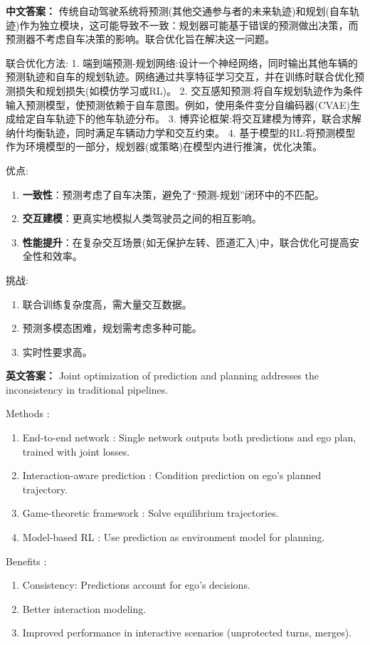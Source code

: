 \documentclass[10pt,a4paper]{ctexart}
\begin{document}
\textbf{中文答案：}  
传统自动驾驶系统将预测(其他交通参与者的未来轨迹)和规划(自车轨迹)作为独立模块，这可能导致不一致：规划器可能基于错误的预测做出决策，而预测器不考虑自车决策的影响。联合优化旨在解决这一问题。

 联合优化方法:
1.  端到端预测-规划网络:设计一个神经网络，同时输出其他车辆的预测轨迹和自车的规划轨迹。网络通过共享特征学习交互，并在训练时联合优化预测损失和规划损失(如模仿学习或RL)。
2.  交互感知预测:将自车规划轨迹作为条件输入预测模型，使预测依赖于自车意图。例如，使用条件变分自编码器(CVAE)生成给定自车轨迹下的他车轨迹分布。
3.  博弈论框架:将交互建模为博弈，联合求解纳什均衡轨迹，同时满足车辆动力学和交互约束。
4.  基于模型的RL:将预测模型作为环境模型的一部分，规划器(或策略)在模型内进行推演，优化决策。

 优点:
\begin{enumerate}
    \item \textbf{一致性}：预测考虑了自车决策，避免了“预测-规划”闭环中的不匹配。
    \item \textbf{交互建模}：更真实地模拟人类驾驶员之间的相互影响。
    \item \textbf{性能提升}：在复杂交互场景(如无保护左转、匝道汇入)中，联合优化可提高安全性和效率。
\end{enumerate}

 挑战:
\begin{enumerate}
    \item 联合训练复杂度高，需大量交互数据。
    \item 预测多模态困难，规划需考虑多种可能。
    \item 实时性要求高。
\end{enumerate}

\textbf{英文答案：}  
Joint optimization of prediction and planning addresses the inconsistency in traditional pipelines.

 Methods :
\begin{enumerate}
    \item End-to-end network : Single network outputs both predictions and ego plan, trained with joint losses.
    \item Interaction-aware prediction : Condition prediction on ego's planned trajectory.
    \item Game-theoretic framework : Solve equilibrium trajectories.
    \item Model-based RL : Use prediction as environment model for planning.
\end{enumerate}

 Benefits :
\begin{enumerate}
    \item Consistency: Predictions account for ego's decisions.
    \item Better interaction modeling.
    \item Improved performance in interactive scenarios (unprotected turns, merges).
\end{enumerate}
\end{document}
